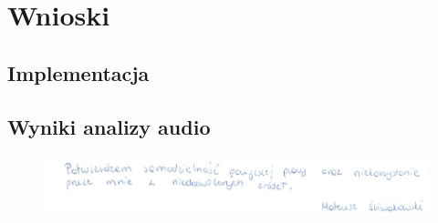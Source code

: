 \documentclass{article}
\begin{document}
\section{Wnioski}
\subsection{Implementacja}

\subsection{Wyniki analizy audio}


\begin{figure}[b]
\centering
\includegraphics[width=5in]{bottom.png}
\end{figure}
\end{document}
